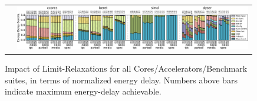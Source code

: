 \begin{figure}
\begin{adjustwidth}{-1.1in}{-1.1in}
\begin{center}

\begin{tabular}{m{0.01\linewidth}m{0.98\linewidth}}
 

\parbox[t]{-1mm}{} & \includegraphics[width=0.95\linewidth]{figs/full-limits-Energy-Delay.pdf}  \\
\end{tabular}
\vspace{-0.18in}
\end{center}
\end{adjustwidth}
\caption{Impact of Limit-Relaxations for all Cores/Accelerators/Benchmark suites, in terms of normalized energy delay.  Numbers above bars indicate maximum energy-delay achievable.}
\vspace{-0.1in}
\label{fig:enDelay}
\end{figure}




